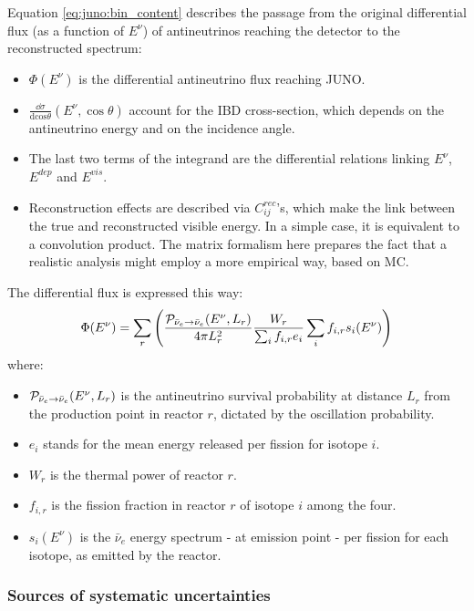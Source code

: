 \documentclass[../main.tex]{subfiles}
\begin{document}
Equation \ref{eq:juno:bin_content} describes the passage from the original differential flux (as a function of $E^{\nu}$) of antineutrinos reaching the detector to the reconstructed spectrum:
\begin{itemize}
  \item $\Phi(E^{\nu})$ is the differential antineutrino flux reaching JUNO.
  \item $\frac{\dd\sigma}{\mathrm{dcos}\theta}(E^{\nu}, \cos\theta)$ account for the IBD cross-section, which depends on the antineutrino energy and on the incidence angle.
  \item The last two terms of the integrand are the differential relations linking $E^{\nu}$, $E^{dep}$ and $E^{vis}$.
  \item Reconstruction effects are described via $C^{rec}_{ij}$'s, which make the link between the true and reconstructed visible energy. In a simple case, it is equivalent to a convolution product. The matrix formalism here prepares the fact that a realistic analysis might employ a more empirical way, based on MC.
\end{itemize}
\hfill

The differential flux is expressed this way:
\begin{equation}
\Phi(E^{\nu}) = \sum_{r} \left( \frac{{\cal P}_{\bar{\nu}_e\rightarrow \bar{\nu}_e}(E^{\nu},L_r)}{4\pi L^2_r} \frac{W_r}{\sum_{i} f_{i,r} e_i} \sum_{i} f_{i,r} s_i(E^{\nu}) \right)
\end{equation}
where:
\begin{itemize}
  \item ${\cal P}_{\bar{\nu}_e\rightarrow \bar{\nu}_e}(E^{\nu},L_r)$ is the antineutrino survival probability at distance $L_r$ from the production point in reactor $r$, dictated by the oscillation probability.
  \item $e_i$ stands for the mean energy released per fission for isotope $i$.
  \item $W_r$ is the thermal power of reactor $r$.
  \item $f_{i,r}$ is the fission fraction in reactor $r$ of isotope $i$ among the four.
  \item $s_i(E^{\nu})$ is the $\bar{\nu}_e$ energy spectrum - at emission point -  per fission for each isotope, as emitted by the reactor.
\end{itemize}
\hfill

\subsubsection{Sources of systematic uncertainties}
\end{document}
